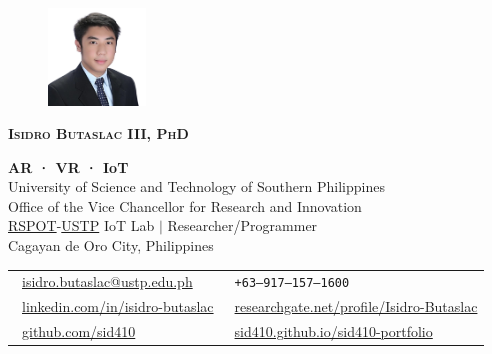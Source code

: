 \documentclass[letterpaper,11pt]{article}
\begin{document}
\begin{figure}
	\vspace{-6pt}
	\hfill\includegraphics[width=0.23\textwidth]{images/mypic-square.png}
\end{figure}

{\LARGE \scshape \textbf{Isidro Butaslac III, PhD}} \\

\begin{adjustwidth}{0.3cm}{0cm}

	{\textbf{AR · VR · IoT}} \\
	{University of Science and Technology of Southern Philippines} \\
	{Office of the Vice Chancellor for Research and Innovation} \\
	{\href{https://www.rspotsolutions.com/}{RSPOT}-\href{https://www.ustp.edu.ph/}{USTP} IoT Lab $|$ Researcher/Programmer} \\
	{Cagayan de Oro City, Philippines} \\

	\vspace{3pt}

	\begin{tabular}{@{} l l}
		{\faEnvelope\ \footnotesize\href{mailto:isidro.butaslac@ustp.edu.ph}{isidro.butaslac@ustp.edu.ph} }               &
		{\faPhone\ \footnotesize\texttt{+63--917--157--1600}}                                                                                                         \\

		{\faLinkedin\ \footnotesize\href{https://www.linkedin.com/in/isidro-butaslac/}{linkedin.com/in/isidro-butaslac} } &
		{\resizebox{4mm}{!}{{\faResearchgate}}\ \footnotesize\href{https://www.researchgate.net/profile/Isidro-Butaslac/}{researchgate.net/profile/Isidro-Butaslac} } \\

		{\faGithub\ \footnotesize\href{https://github.com/sid410}{github.com/sid410} }                                    &
		{\faBriefcase\ \footnotesize\href{https://sid410.github.io/sid410-portfolio/}{sid410.github.io/sid410-portfolio} }                                            \\
	\end{tabular}

\end{adjustwidth}
\end{document}
